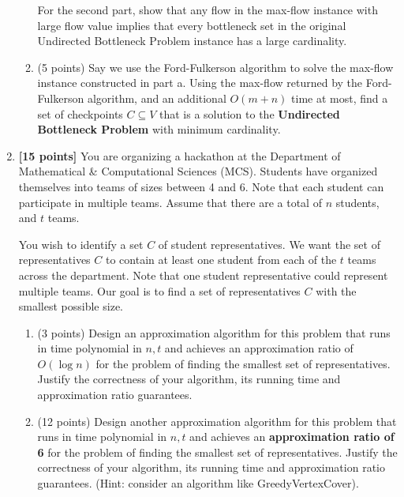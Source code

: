 \documentclass{assignment-373}
\begin{document}
\begin{enumerate}
\begin{enumerate}
    For the second part, show that any flow in the max-flow instance
    with large flow value implies that every bottleneck set in the
    original Undirected Bottleneck Problem instance has a large
    cardinality.
    
  \item (5 points) Say we use the Ford-Fulkerson algorithm to solve
    the max-flow instance constructed in part a. Using the max-flow
    returned by the Ford-Fulkerson algorithm, and an additional
    $O(m+n)$ time at most, find a set of checkpoints $C \subseteq V$
    that is a solution to the \textbf{Undirected Bottleneck Problem}
    with minimum cardinality.
  \end{enumerate}
  
\item \textbf{[15 points]}
%
  You are organizing a hackathon at the Department of Mathematical \&
  Computational Sciences (MCS).  Students have organized themselves
  into teams of sizes between 4 and 6.  Note that each student can
  participate in multiple teams. Assume that there are a total of $n$
  students, and $t$ teams.

  You wish to identify a set $C$ of student representatives. We want
  the set of representatives $C$ to contain at least one student from
  each of the $t$ teams across the department. Note that one student
  representative could represent multiple teams. Our goal is to find a
  set of representatives $C$ with the smallest possible size.
  
  \begin{enumerate}
  \item (3 points) Design an approximation algorithm for this problem
    that runs in time polynomial in $n, t$ and achieves an
    approximation ratio of $O(\log n)$ for the problem of finding the
    smallest set of representatives. Justify the correctness of your
    algorithm, its running time and approximation ratio guarantees.
  \item (12 points) Design another approximation algorithm for this
    problem that runs in time polynomial in $n, t$ and achieves an
    \textbf{approximation ratio of 6} for the problem of finding the
    smallest set of representatives. Justify the correctness of your
    algorithm, its running time and approximation ratio
    guarantees. (Hint: consider an algorithm like GreedyVertexCover).
  \end{enumerate}

\end{enumerate}
\end{document}
